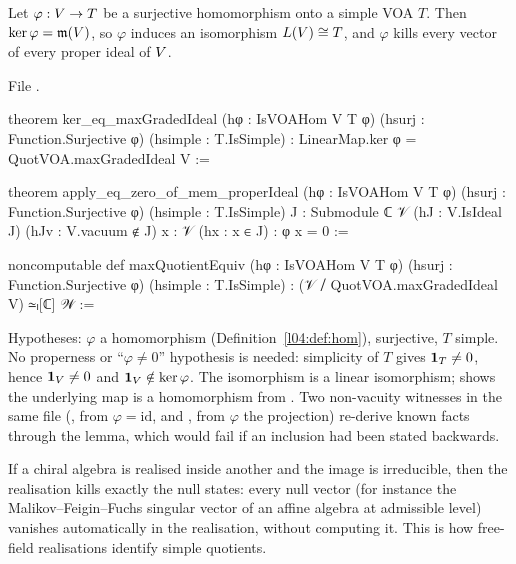 \begin{theorem}\label{l04:thm:transfer}
Let $\varphi:V\to T$ be a surjective homomorphism onto a simple VOA $T$. Then $\ker\varphi =
\mathfrak{m}(V)$, so $\varphi$ induces an isomorphism $L(V)\cong T$, and $\varphi$ kills every
vector of every proper ideal of $V$.
\end{theorem}
\noindent File .
\begin{leancode}
theorem ker_eq_maxGradedIdeal (hφ : IsVOAHom V T φ) (hsurj : Function.Surjective φ)
    (hsimple : T.IsSimple) : LinearMap.ker φ = QuotVOA.maxGradedIdeal V :=

theorem apply_eq_zero_of_mem_properIdeal (hφ : IsVOAHom V T φ)
    (hsurj : Function.Surjective φ) (hsimple : T.IsSimple)
    {J : Submodule ℂ 𝒱} (hJ : V.IsIdeal J) (hJv : V.vacuum ∉ J)
    {x : 𝒱} (hx : x ∈ J) : φ x = 0 :=

noncomputable def maxQuotientEquiv (hφ : IsVOAHom V T φ) (hsurj : Function.Surjective φ)
    (hsimple : T.IsSimple) : (𝒱 ⧸ QuotVOA.maxGradedIdeal V) ≃ₗ[ℂ] 𝒲 :=
\end{leancode}
\begin{dictionary}
Hypotheses: $\varphi$ a homomorphism (Definition~\ref{l04:def:hom}), surjective, $T$ simple. No
properness or ``$\varphi\ne0$'' hypothesis is needed: simplicity of $T$ gives $\mathbf{1}_T\ne0$, hence
$\mathbf{1}_V\ne0$ and $\mathbf{1}_V\notin\ker\varphi$. The isomorphism  is a
linear isomorphism; \allowbreak{} shows the underlying map is a homomorphism from
. Two non-vacuity witnesses in the same file
(\allowbreak{}\allowbreak{}\allowbreak{}\allowbreak{}, from $\varphi = \mathrm{id}$, and
\allowbreak{}\allowbreak{}\allowbreak{}\allowbreak{}, from $\varphi$ the projection) re-derive known facts through
the lemma, which would fail if an inclusion had been stated backwards.
\end{dictionary}
\begin{physics}
If a chiral algebra is realised inside another and the image is irreducible, then the realisation
kills exactly the null states: every null vector (for instance the Malikov--Feigin--Fuchs singular
vector of an affine algebra at admissible level) vanishes automatically in the realisation, without
computing it. This is how free-field realisations identify simple quotients.
\end{physics}
